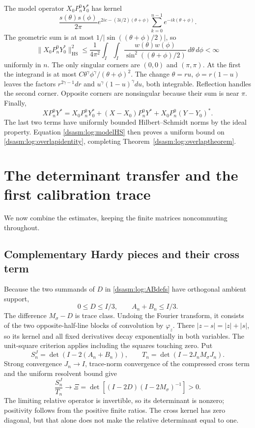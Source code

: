 \documentclass[11pt,letterpaper]{article}
\theoremstyle{remark}\newtheorem{remark}[theorem]{Remark}
\newcommand{\HS}{\mathrm{HS}}
\begin{document}
The model operator $X_0P_n^0Y_0^*$ has kernel
\[
 \frac{s(\theta)s(\phi)}{2\pi}
 e^{2ic-(3i/2)(\theta+\phi)}
             \sum_{k=0}^{n-1}e^{-ik(\theta+\phi)}.
\]
The geometric sum is at most $1/|\sin((\theta+\phi)/2)|$, so
\begin{equation}\label{dsasm:log:modelHS}
 \|X_0P_n^0Y_0^*\|_\HS^2
 \le\frac1{4\pi^2}\int_I\int_I
       \frac{w(\theta)w(\phi)}{\sin^2((\theta+\phi)/2)}\,d\theta\,d\phi
 <\infty
\end{equation}
uniformly in $n$. The only singular corners are $(0,0)$ and
$(\pi,\pi)$. At the first the integrand is at most
$C\theta^\gamma\phi^\gamma/(\theta+\phi)^2$.
The change $\theta=ru$, $\phi=r(1-u)$ leaves the factors
$r^{2\gamma-1}dr$ and $u^\gamma(1-u)^\gamma du$, both integrable.
Reflection handles the second corner. Opposite corners are
nonsingular because their sum is near $\pi$.
Finally,
\[
 XP_n^0Y^*=X_0P_n^0Y_0^*+(X-X_0)P_n^0Y^*
                          +X_0P_n^0(Y-Y_0)^*.
\]
The last two terms have uniformly bounded Hilbert--Schmidt norms by
the ideal property. Equation \eqref{dsasm:log:modelHS} then proves a uniform
bound on \eqref{dsasm:log:overlapidentity}, completing
Theorem~\ref{dsasm:log:overlaptheorem}.

\section{The determinant transfer and the first calibration trace}
\label{dsasm:log:sec:transfer}
We now combine the estimates, keeping the finite matrices
noncommuting throughout.

\subsection{Complementary Hardy pieces and their cross term}
Because the two summands of $D$ in \eqref{dsasm:log:ABdefs} have orthogonal
ambient support,
\[
 0\le D\le I/3,\qquad A_n+B_n\le I/3.
\]
The difference $M_\sigma-D$ is trace class. Undoing the Fourier
transform, it consists of the two opposite-half-line blocks of
convolution by $\varphi_z$. There $|z-s|=|z|+|s|$, so its kernel
and all fixed derivatives decay exponentially in both variables.
The unit-square criterion applies including the squares touching
zero. Put
\[
 S_n^J=\det(I-2(A_n+B_n)),\qquad T_n=\det(I-2J_nM_\sigma J_n).
\]
Strong convergence $J_n\to I$, trace-norm convergence of the
compressed cross term and the uniform resolvent bound give
\begin{equation}\label{dsasm:log:crossdet}
 \frac{S_n^J}{T_n}\longrightarrow
 \Xi=\det[(I-2D)(I-2M_\sigma)^{-1}]>0.
\end{equation}
The limiting relative operator is invertible, so its determinant is
nonzero; positivity follows from the positive finite ratios. The
cross kernel has zero diagonal, but that alone does not make the
relative determinant equal to one.
\end{document}
